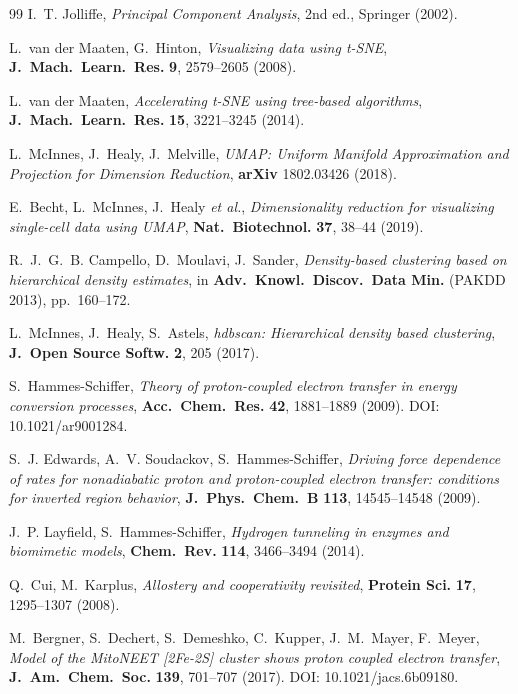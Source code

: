 \documentclass[11pt,a4paper,twoside]{article}
\theoremstyle{remark}
\begin{document}
\begin{thebibliography}{99}
I.~T. Jolliffe,
\emph{Principal Component Analysis},
2nd ed., Springer (2002).

L.~van der Maaten, G.~Hinton,
\emph{Visualizing data using t-SNE},
\textbf{J.\ Mach.\ Learn.\ Res.} \textbf{9}, 2579--2605 (2008).

L.~van der Maaten,
\emph{Accelerating t-SNE using tree-based algorithms},
\textbf{J.\ Mach.\ Learn.\ Res.} \textbf{15}, 3221--3245 (2014).

L.~McInnes, J.~Healy, J.~Melville,
\emph{UMAP: Uniform Manifold Approximation and Projection for
Dimension Reduction},
\textbf{arXiv} 1802.03426 (2018).

E.~Becht, L.~McInnes, J.~Healy \emph{et al.},
\emph{Dimensionality reduction for visualizing single-cell data using
UMAP},
\textbf{Nat.\ Biotechnol.} \textbf{37}, 38--44 (2019).

R.~J.~G.~B. Campello, D.~Moulavi, J.~Sander,
\emph{Density-based clustering based on hierarchical density estimates},
in \textbf{Adv.\ Knowl.\ Discov.\ Data Min.} (PAKDD 2013), pp.~160--172.

L.~McInnes, J.~Healy, S.~Astels,
\emph{hdbscan: Hierarchical density based clustering},
\textbf{J.\ Open Source Softw.} \textbf{2}, 205 (2017).


S.~Hammes-Schiffer,
\emph{Theory of proton-coupled electron transfer in energy conversion
processes},
\textbf{Acc.\ Chem.\ Res.} \textbf{42}, 1881--1889 (2009).
DOI: 10.1021/ar9001284.

S.~J. Edwards, A.~V. Soudackov, S.~Hammes-Schiffer,
\emph{Driving force dependence of rates for nonadiabatic proton and
proton-coupled electron transfer: conditions for inverted region behavior},
\textbf{J.\ Phys.\ Chem.\ B} \textbf{113}, 14545--14548 (2009).

J.~P. Layfield, S.~Hammes-Schiffer,
\emph{Hydrogen tunneling in enzymes and biomimetic models},
\textbf{Chem.\ Rev.} \textbf{114}, 3466--3494 (2014).

Q.~Cui, M.~Karplus,
\emph{Allostery and cooperativity revisited},
\textbf{Protein Sci.} \textbf{17}, 1295--1307 (2008).

M.~Bergner, S.~Dechert, S.~Demeshko, C.~Kupper, J.~M.~Mayer, F.~Meyer,
\emph{Model of the {MitoNEET} {[}2Fe-2S{]} cluster shows proton coupled
electron transfer},
\textbf{J.\ Am.\ Chem.\ Soc.} \textbf{139}, 701--707 (2017).
DOI: 10.1021/jacs.6b09180.


\end{thebibliography}
\end{document}
